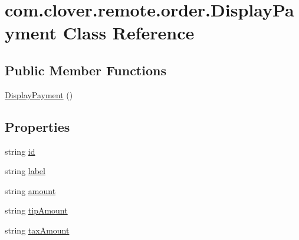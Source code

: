 \hypertarget{classcom_1_1clover_1_1remote_1_1order_1_1_display_payment}{}\section{com.\+clover.\+remote.\+order.\+Display\+Payment Class Reference}
\label{classcom_1_1clover_1_1remote_1_1order_1_1_display_payment}
\subsection*{Public Member Functions}
\begin{DoxyCompactItemize}
\item 
\hyperlink{classcom_1_1clover_1_1remote_1_1order_1_1_display_payment_a126dd8684759d87e8be8551ede43c8ee}{Display\+Payment} ()
\end{DoxyCompactItemize}
\subsection*{Properties}
\begin{DoxyCompactItemize}
\item 
string \hyperlink{classcom_1_1clover_1_1remote_1_1order_1_1_display_payment_a3291b3788d64296db72223e5af2b0c32}{id}
\item 
string \hyperlink{classcom_1_1clover_1_1remote_1_1order_1_1_display_payment_af414138504b940f672907285873f98e3}{label}
\item 
string \hyperlink{classcom_1_1clover_1_1remote_1_1order_1_1_display_payment_a4933675d71aed714ec7ac90624a2c99c}{amount}
\item 
string \hyperlink{classcom_1_1clover_1_1remote_1_1order_1_1_display_payment_afa9552c29076962d4e9f74f9395f4b4b}{tip\+Amount}
\item 
string \hyperlink{classcom_1_1clover_1_1remote_1_1order_1_1_display_payment_ab15e9b7d1c6adeb4002fe9bae2f10db4}{tax\+Amount}
\end{DoxyCompactItemize}


